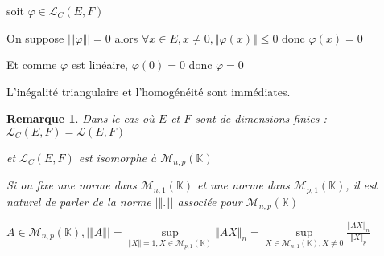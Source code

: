 \documentclass[a4paper,12pt]{book}
\newcommand{\Pre}[1]{\begin{tcolorbox}[sharp corners, colback=white,colframe=green!60!green!30!black!75, title=Preuve]#1\end{tcolorbox}}
\newtheorem{Rem}{Remarque}[section]
\def\K{\mathbb{K}}
\begin{document}
\Pre{soit $\varphi\in\mathcal{L}_C(E,F)$ \par On suppose $\vert\Vert\varphi\Vert\vert=0$ alors $\forall x\in E, x\neq 0, \Vert \varphi(x)\Vert\leq 0$ donc $\varphi(x)=0$ \par Et comme $\varphi$ est linéaire, $\varphi(0)=0$ donc $\varphi=0$ \par L'inégalité triangulaire et l'homogénéité sont immédiates.}
\begin{Rem}
Dans le cas où $E$ et $F$ sont de dimensions finies : $\mathcal{L}_C(E,F)=\mathcal{L}(E,F)$ \par et $\mathcal{L}_C(E,F)$ est isomorphe à $\mathcal{M}_{n,p}(\K)$ \par Si on fixe une norme dans $\mathcal{M}_{n,1}(\K)$ et une norme dans $\mathcal{M}_{p,1}(\K)$, il est naturel de parler de la norme $\vert\Vert.\Vert\vert$ associée pour $\mathcal{M}_{n,p}(\K)$ \par $A\in\mathcal{M}_{n,p}(\K), \vert\Vert A\Vert\vert =\sup\limits_{\Vert X\Vert=1, X\in\mathcal{M}_{p,1}(\K)} \Vert AX\Vert_n = \sup\limits_{X\in\mathcal{M}_{n,1}(\K), X\neq 0} \frac{\Vert AX\Vert_n}{\Vert X\Vert_p}$
\end{Rem}
\end{document}
